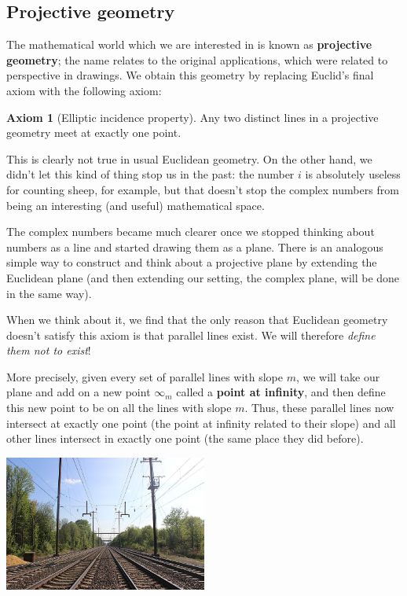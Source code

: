 \documentclass[a4paper,leqno,10pt]{article}
\theoremstyle{exercise}
\theoremstyle{plain}
\theoremstyle{definition}
\newtheorem*{axiom}{Axiom}
\theoremstyle{remark}
\newcommand{\df}{\textbf}
\begin{document}
\subsection{Projective geometry}
The mathematical world which we are interested in is known as \df{projective geometry}; the name relates to the original
applications, which were related to perspective in drawings. We obtain this geometry by replacing Euclid's final axiom with the following axiom:
\begin{axiom}[Elliptic incidence property]
  Any two distinct lines in a projective geometry meet at exactly one point.
\end{axiom}
This is clearly not true in usual Euclidean geometry. On the other hand, we didn't let this kind of thing stop us in the
past: the number $ i $ is absolutely useless for counting sheep, for example, but that doesn't stop the complex numbers from
being an interesting (and useful) mathematical space.

The complex numbers became much clearer once we stopped thinking about numbers as a line and started drawing them as a plane. There
is an analogous simple way to construct and think about a projective plane by extending the Euclidean plane (and then extending our
setting, the complex plane, will be done in the same way).

When we think about it, we find that the only reason that Euclidean geometry doesn't satisfy this axiom is that parallel lines exist.
We will therefore \emph{define them not to exist}!

More precisely, given every set of parallel lines with slope $ m $, we will take our plane and add on a new point $ \infty_m $ called
a \df{point at infinity}, and then define this new point to be on all the lines with slope $ m $. Thus, these parallel lines now
intersect at exactly one point (the point at infinity related to their slope) and all other lines intersect in exactly one point (the
same place they did before).

\begin{center}
  \includegraphics[width=0.5\textwidth]{vanishingpoint}
\end{center}
\end{document}
